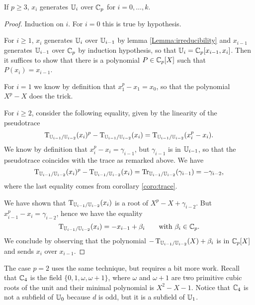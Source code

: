\begin{lemma}
  \label{Lemma:primitive>2}
  If $p\ge3$, $x_i$ generates $\mathbb{U}_i$ over $\mathbb{C}_p$ for $i=0,\ldots,k$.
\end{lemma}
\begin{proof}
  Induction on $i$. For $i=0$ this is true by hypothesis.

  For $i\ge1$, $x_i$ generates $\mathbb{U}_i$ over $\mathbb{U}_{i-1}$ by lemma
  \ref{Lemma:irreducibility} and $x_{i-1}$ generates $\mathbb{U}_{i-1}$ over
  $\mathbb{C}_p$ by induction hypothesis, so that $\mathbb{U}_i =
  \mathbb{C}_p[x_{i-1},x_i]$. Then it suffices to show that there is a
  polynomial $P\in\mathbb{C}_p[X]$ such that $P(x_i) = x_{i-1}$.

  For $i=1$ we know by definition that $x_1^p-x_1=x_0$, so that the
  polynomial $X^p-X$ does the trick.

  For $i\ge2$, consider the following equality, given by the linearity
  of the pseudotrace
  \begin{equation*}
    \operatorname{T}_{\mathbb{U}_{i-1}/\mathbb{U}_{i-2}}(x_i)^p - \operatorname{T}_{\mathbb{U}_{i-1}/\mathbb{U}_{i-2}}(x_i) =
    \operatorname{T}_{\mathbb{U}_{i-1}/\mathbb{U}_{i-2}}(x_i^p-x_i)\text{.}
  \end{equation*}
  We know by definition that $x_i^p-x_i=\gamma_{i-1}$, but
  $\gamma_{i-1}$ is in $\mathbb{U}_{i-1}$, so that the pseudotrace coincides
  with the trace as remarked above. We have
  \begin{equation*}
    \operatorname{T}_{\mathbb{U}_{i-1}/\mathbb{U}_{i-2}}(x_i)^p - \operatorname{T}_{\mathbb{U}_{i-1}/\mathbb{U}_{i-2}}(x_i) =
    \operatorname{Tr}_{\mathbb{U}_{i-1}/\mathbb{U}_{i-2}}(\gamma_{i-1}) = -\gamma_{i-2} \text{,}
  \end{equation*}
  where the last equality comes from corollary \ref{coro:trace}.

  We have shown that $\operatorname{T}_{\mathbb{U}_{i-1}/\mathbb{U}_{i-2}}(x_i)$ is a root of
  ${X^p-X+\gamma_{i-2}}$. But ${x_{i-1}^p-x_i=\gamma_{i-2}}$, hence we
  have the equality
  \begin{equation*}
    \operatorname{T}_{\mathbb{U}_{i-1}/\mathbb{U}_{i-2}}(x_i) = -x_{i-1}+\beta_i
    \qquad\text{with $\beta_i\in\mathbb{C}_p$.}
  \end{equation*}
  We conclude by observing that the polynomial
  $-\operatorname{T}_{\mathbb{U}_{i-1}/\mathbb{U}_{i-2}}(X)+\beta_i$ is in $\mathbb{C}_p[X]$ and sends
  $x_i$ over $x_{i-1}$.
\end{proof}

The case $p=2$ uses the same technique, but requires a bit more
work. Recall that $\mathbb{C}_4$ is the field $\{0,1,\omega,\omega+1\}$, where
$\omega$ and $\omega+1$ are two primitive cubic roots of the unit and
their minimal polynomial is $X^2-X-1$. Notice that $\mathbb{C}_4$ is not a
subfield of $\mathbb{U}_0$ because $d$ is odd, but it is a subfield of $\mathbb{U}_1$.

